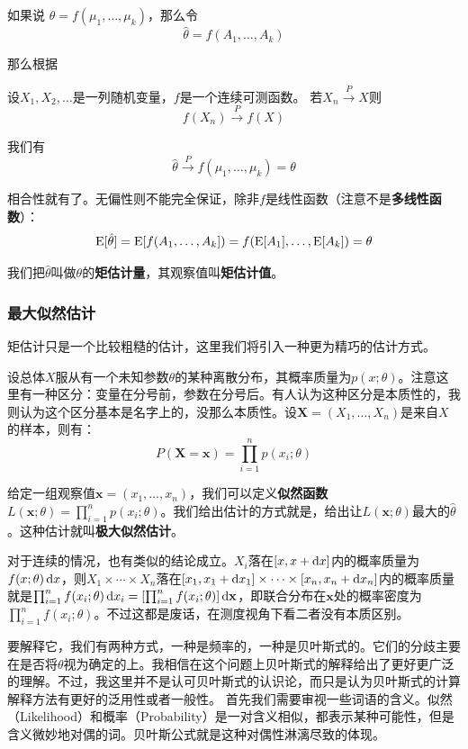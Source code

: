 如果说
$\theta=f(\mu_1,\ldots,\mu_k)$，那么令
\[
\hat{\theta} = f(A_1,\ldots,A_k)
\]

那么根据
\begin{theorem}[弱连续映射定理]
设$X_1,X_2,\ldots$是一列随机变量，$f$是一个连续可测函数。
若$X_n\stackrel{P}{\longrightarrow}X$则
\[
f(X_n)\stackrel{P}{\longrightarrow}f(X)
\]
\end{theorem}

我们有
\[
\hat{\theta} \stackrel{P}{\longrightarrow}f(\mu_1,\ldots,\mu_k)=\theta
\]

相合性就有了。无偏性则不能完全保证，除非$f$是线性函数（注意不是\textbf{多线性函数}）：
\[
\operatorname{E}[\hat{\theta}] = \operatorname{E}[f(A_1,\ldots,A_k]) = f(\operatorname{E}[A_1],\ldots,\operatorname{E}[A_k]) = \theta
\]

我们把$\hat{\theta}$叫做$\theta$的\textbf{矩估计量}，其观察值叫\textbf{矩估计值}。

\subsubsection{最大似然估计}
矩估计只是一个比较粗糙的估计，这里我们将引入一种更为精巧的估计方式。

设总体$X$服从有一个未知参数$\theta$的某种离散分布，其概率质量为$p(x;\theta)$。注意这里有一种区分：变量在分号前，参数在分号后。有人认为这种区分是本质性的，我则认为这个区分基本是名字上的，没那么本质性。设$\mathbf{X}=(X_1,\ldots,X_n)$是来自$X$的样本，则有：
\[
P(\mathbf{X}=\mathbf{x}) = \prod_{i=1}^np(x_i;\theta)
\]

给定一组观察值$\mathbf{x}=(x_1,\ldots,x_n)$，我们可以定义\textbf{似然函数}$L(\mathbf{x};\theta)=\prod_{i=1}^np(x_i;\theta)$。我们给出估计的方式就是，给出让$L(\mathbf{x};\theta)$最大的$\hat{\theta}$。这种估计就叫\textbf{极大似然估计}。

对于连续的情况，也有类似的结论成立。$X_i$落在$[x,x+\mathop{}\!\mathrm{d} x]$内的概率质量为$f(x;\theta)\mathop{}\!\mathrm{d} x$，则$X_1\times\cdots\times X_n$落在$[x_1,x_1+\mathop{}\!\mathrm{d} x_1]\times\cdots\times[x_n,x_n+\mathop{}\!\mathrm{d} x_n]$内的概率质量就是$ \prod_{i=1}^nf(x_i;\theta)\mathop{}\!\mathrm{d} x_i=\left[\prod_{i=1}^nf(x_i;\theta)\right]\mathop{}\!\mathrm{d}\mathbf{x}$，即联合分布在$\mathbf{x}$处的概率密度为$\prod_{i=1}^nf(x_i;\theta)$。不过这都是废话，在测度视角下看二者没有本质区别。

要解释它，我们有两种方式，一种是频率的，一种是贝叶斯式的。它们的分歧主要在是否将$\theta$视为确定的上。我相信在这个问题上贝叶斯式的解释给出了更好更广泛的理解。不过，我这里并不是认可贝叶斯式的认识论，而只是认为贝叶斯式的计算解释方法有更好的泛用性或者一般性。
首先我们需要审视一些词语的含义。似然（Likelihood）和概率（Probability）是一对含义相似，都表示某种可能性，但是含义微妙地对偶的词。贝叶斯公式就是这种对偶性淋漓尽致的体现。

